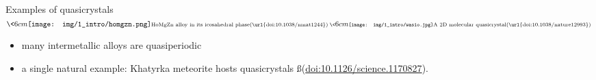 \begin{frame}{Examples of quasicrystals}
\(
	\<{6cm}
		\centering
		\texttt{[image: img/1\_intro/homgzn.png]}
		
		\ss{HoMgZn alloy in its icosahedral phase} \ss{(\url{doi:10.1038/nmat1244})}
	\>
	\<{6cm}
		\centering
		\texttt{[image: img/1\_intro/wasio.jpg]}
		
		\ss{A 2D molecular quasicrystal} \ss{(\url{doi:10.1038/nature12993})}
	\>
\)

\begin{itemize}
	\item many intermetallic alloys are quasiperiodic
	\item a single natural example: Khatyrka meteorite hosts quasicrystals \ss{(\url{doi:10.1126/science.1170827})}. 
\end{itemize}
\end{frame}
